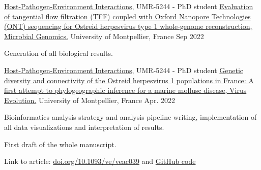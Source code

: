 

\begin{cventries}

  \cventry
    {\href{http://ihpe.univ-perp.fr/}{Host-Pathogen-Environment Interactions}, UMR-5244 - PhD student} %
    {\href{https://doi.org/10.1093/ve/veac039}{Evaluation of tangential flow filtration (TFF) coupled with Oxford Nanopore Technologies (ONT) sequencing for Ostreid herpesvirus type 1 whole-genome reconstruction, Microbial Genomics.}} %
    {University of Montpellier, France} %
    {Sep 2022} %
    {
      \begin{cvitems} %
        \item {Generation of all biological results.}
      \end{cvitems}
    }

  \cventry
    {\href{http://ihpe.univ-perp.fr/}{Host-Pathogen-Environment Interactions}, UMR-5244 - PhD student} %
    {\href{https://doi.org/10.1093/ve/veac039}{Genetic diversity and connectivity of the Ostreid herpesvirus 1 populations in France: A first attempt to phylogeographic inference for a marine mollusc disease, Virus Evolution.}} %
    {University of Montpellier, France} %
    {Apr. 2022} %
    {
      \begin{cvitems} %
        \item {Bioinformatics analysis strategy and analysis pipeline writing, implementation of all data visualizations and interpretation of results.}
        \item {First draft of the whole manuscript.}
        \item Link to article: {\href{https://doi.org/10.1093/ve/veac039}{doi.org/10.1093/ve/veac039} and  \href{https://github.com/propan2one/OshV-1-molepidemio}{GitHub code}}
      \end{cvitems}
    }
    

\end{cventries}
